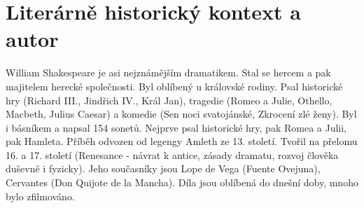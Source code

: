\documentclass[11pt]{article}
\begin{document}
    \section*{Literárně historický kontext a autor}
    William Shakespeare je asi nejznámějším dramatikem. Stal se hercem a pak majitelem herecké společnosti.
    Byl oblíbený u královské rodiny.
    Psal historické hry (Richard III., Jindřich IV., Král Jan), tragedie (Romeo a Julie, Othello, Macbeth, Julius Caesar) a komedie (Sen noci svatojánské, Zkrocení zlé ženy).
    Byl i básníkem a napsal 154 sonetů.
    Nejprve psal historické hry, pak Romea a Julii, pak Hamleta.
    Příběh odvozen od legengy Amleth ze 13. století.
    Tvořil na přelomu 16. a 17. století (Renesance - návrat k antice, zásady dramatu, rozvoj člověka duševně i fyzicky).
    Jeho současníky jsou Lope de Vega (Fuente Ovejuna), Cervantes (Don Quijote de la Mancha).
    Díla jsou oblíbená do dnešní doby, mnoho bylo zfilmováno.
\end{document}
